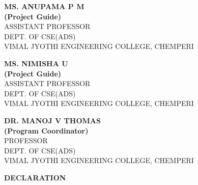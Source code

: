 \documentclass[12pt,a4paper]{article}
\begin{document}
\noindent
\begin{minipage}[t]{0.31\textwidth}
    \raggedright
    \textbf{MS. ANUPAMA P M}\\[0.2cm]
    \textbf{(Project Guide)}\\[0.2cm]
    \small{ASSISTANT PROFESSOR}\\
    \small{DEPT. OF CSE(ADS)}\\
    \small{VIMAL JYOTHI ENGINEERING COLLEGE, CHEMPERI}
\end{minipage}
\hfill
\begin{minipage}[t]{0.31\textwidth}
    \raggedright
    \textbf{MS. NIMISHA U}\\[0.2cm]
    \textbf{(Project Guide)}\\[0.2cm]
    \small{ASSISTANT PROFESSOR}\\
    \small{DEPT. OF CSE(ADS)}\\
    \small{VIMAL JYOTHI ENGINEERING COLLEGE, CHEMPERI}
\end{minipage}
\hfill
\begin{minipage}[t]{0.31\textwidth}
    \raggedright
    \textbf{DR. MANOJ V THOMAS}\\[0.2cm]
    \textbf{(Program Coordinator)}\\[0.2cm]
    \small{PROFESSOR}\\
    \small{DEPT. OF CSE(ADS)}\\
    \small{VIMAL JYOTHI ENGINEERING COLLEGE, CHEMPERI}
\end{minipage}

\newpage
\thispagestyle{empty}

\begin{center}
    {\bfseries \Large DECLARATION \par}
    \vspace{1.5cm}
\end{center}
\end{document}

